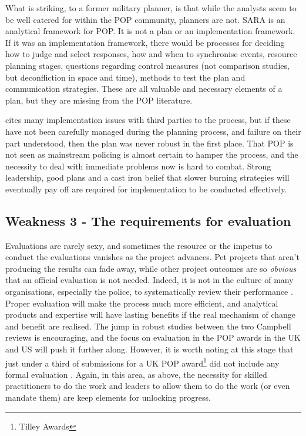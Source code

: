 What is striking, to a former military planner, is that while the analysts seem to be well catered for within the POP community, planners are not. SARA is an analytical framework for POP. It is not a plan or an implementation framework. If it was an implementation framework, there would be processes for deciding how to judge and select responses, how and when to synchronise events, resource planning stages, questions regarding control measures (not comparison studies, but deconfliction in space and time), methods to test the plan and communication strategies. These are all valuable and necessary elements of a plan, but they are missing from the POP literature. 

\textcite{hinkle2020problem} cites many implementation issues with third parties to the process, but if these have not been carefully managed during the planning process, and failure on their part understood, then the plan was never robust in the first place. That POP is not seen as mainstream policing is almost certain to hamper the process, and the necessity to deal with immediate problems now is hard to combat. Strong leadership, good plans and a cast iron belief that slower burning strategies will eventually pay off are required for implementation to be conducted effectively.

 
 \subsection{Weakness 3 - The requirements for evaluation}



Evaluations are rarely sexy, and sometimes the resource or the impetus to conduct the evaluations vanishes as the project advances. Pet projects that aren’t producing the results can fade away, while other project outcomes are so \emph{obvious} that an official evaluation is not needed. Indeed, it is not in the culture of many organisations, especially the police, to systematically review their performance \parencite{goldstein1990}. Proper evaluation will make the process much more efficient, and analytical products and expertise will have lasting benefits if the real mechanism of change and benefit are realised. The jump in robust studies between the two Campbell reviews is encouraging, and the focus on evaluation in the POP awards in the UK and US will push it further along. However, it is worth noting at this stage that just under a third of submissions for a UK POP award\footnote{Tilley Awards} did not include any formal evaluation \parencite{POPUCL}. Again, in this area, as above, the necessity for skilled practitioners to do the work and leaders to allow them to do the work (or even mandate them) are keep elements for unlocking progress.  

